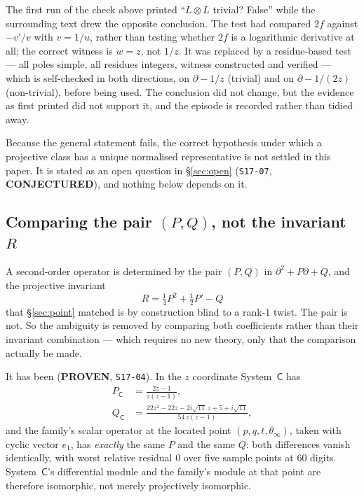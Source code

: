 \begin{remark}\label{rem:contradiction}
The first run of the check above printed ``$L\otimes L$ trivial? False'' while
the surrounding text drew the opposite conclusion. The test had compared $2f$
against $-v'/v$ with $v=1/u$, rather than testing whether $2f$ is a logarithmic
derivative at all; the correct witness is $w=z$, not $1/z$. It was replaced by
a residue-based test --- all poles simple, all residues integers, witness
constructed and verified --- which is self-checked in both directions, on
$\partial-1/z$ (trivial) and on $\partial-1/(2z)$ (non-trivial), before being
used. The conclusion did not change, but the evidence as first printed did not
support it, and the episode is recorded rather than tidied away.
\end{remark}

Because the general statement fails, the correct hypothesis under which a
projective class has a unique normalised representative is not settled in this
paper. It is stated as an open question in \S\ref{sec:open}
(\texttt{S17-07}, \textbf{CONJECTURED}), and nothing below depends on it.

\subsection{Comparing the pair \texorpdfstring{$(P,Q)$}{(P,Q)}, not the
invariant \texorpdfstring{$R$}{R}}\label{ssec:pq}

A second-order operator is determined by the pair $(P,Q)$ in
$\partial^2+P\partial+Q$, and the projective invariant
\[
  R=\tfrac14P^2+\tfrac12P'-Q
\]
that \S\ref{sec:point} matched is by construction blind to a rank-$1$ twist.
The pair is not. So the ambiguity is removed by comparing both coefficients
rather than their invariant combination --- which requires no new theory, only
that the comparison actually be made.

It has been (\textbf{PROVEN}, \texttt{S17-04}). In the $z$ coordinate
System~$\mathsf C$ has
\begin{align}
  P_{\mathsf C}&=\frac{2z-1}{z(z-1)},\label{eq:PC}\\[2pt]
  Q_{\mathsf C}&=\frac{22z^2-22z-2i\sqrt{11}\,z+5+i\sqrt{11}}
                     {54\,z(z-1)},\label{eq:QC}
\end{align}
and the family's scalar operator at the located point $(p,q,t,\theta_\infty)$,
taken with cyclic vector $e_1$, has \emph{exactly} the same $P$ and the same
$Q$: both differences vanish identically, with worst relative residual $0$ over
five sample points at $60$ digits. System~$\mathsf C$'s differential module and
the family's module at that point are therefore isomorphic, not merely
projectively isomorphic.

